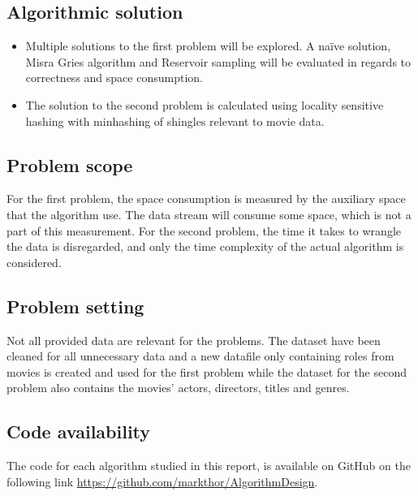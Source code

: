 \subsection{Algorithmic solution}
\begin{itemize}
	\item Multiple solutions to the first problem will be explored. A naïve solution, Misra Gries algorithm and Reservoir sampling will be evaluated in regards to correctness and space consumption.
	\item The solution to the second problem is calculated using locality sensitive hashing with minhashing of shingles relevant to movie data.
\end{itemize}

\subsection{Problem scope}
For the first problem, the space consumption is measured by the auxiliary space that the algorithm use. The data stream will consume some space, which is not a part of this measurement. For the second problem, the time it takes to wrangle the data is disregarded, and only the time complexity of the actual algorithm is considered.

\subsection{Problem setting}
Not all provided data are relevant for the problems. The dataset have been cleaned for all unnecessary data and a new datafile only containing roles from movies is created and used for the first problem while the dataset for the second problem also contains the movies' actors, directors, titles and genres.

\subsection{Code availability}
The code for each algorithm studied in this report, is available on GitHub on the following link \url{https://github.com/markthor/AlgorithmDesign}.